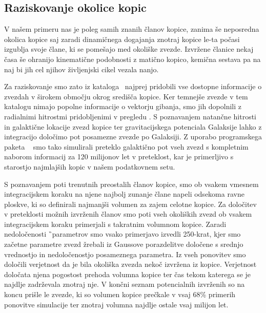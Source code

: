 \subsection{Raziskovanje okolice kopic}
V našem primeru nas je poleg samih znanih članov kopice, zanima še neposredna okolica kopice saj zaradi dinamičnega dogajanja znotraj kopice le-ta počasi izgublja svoje člane, ki se pomešajo med okoliške zvezde. Izvržene članice nekaj časa še ohranijo kinematične podobnosti z matično kopico, kemična sestava pa na naj bi jih cel njihov življenjski cikel vezala nanjo. 

Za raziskovanje smo zato iz kataloga \Gs\ najprej pridobili vse dostopne informacije o zvezdah v širokem območju okrog središča kopice. Ker temnejše zvezde v tem katalogu nimajo popolne informacije o vektorju gibanja, smo jih dopolnili z radialnimi hitrostmi pridobljenimi v pregledu \Gh. S poznavanjem natančne hitrosti in galaktične lokacije zvezd kopice ter gravitacijskega potenciala Galaksije lahko z integracijo določimo pot posamezne zvezde po Galaksiji. Z uporabo programskega paketa \GP\ \cite{2015ApJS..216...29B} smo tako simulirali preteklo galaktično pot vseh zvezd s kompletnim naborom informacij za 120 milijonov let v preteklost, kar je primerljivo s starostjo najmlajših kopic v našem podatkovnem setu.

S poznavanjem poti trenutnih preostalih članov kopice, smo ob vsakem vmesnem integracijskem koraku na njene najbolj zunanje člane napeli odsekoma ravne ploskve, ki so definirali najmanjši volumen za zajem celotne kopice. Za določitev v preteklosti možnih izvrženih članov smo poti vseh okoliških zvezd ob vsakem integracijskem koraku primerjali s takratnim volumnom kopice. Zaradi nedoločenosti \G\ parametrov smo vsako primerjavo izvedli 250-krat, kjer smo začetne parametre zvezd žrebali iz Gaussove porazdelitve določene s srednjo vrednostjo in nedoločenostjo posameznega parametra. Iz vseh ponovitev smo določili verjetnost da je bila okoliška zvezda nekoč izvržena iz kopice. Verjetnost določata njena pogostost prehoda volumna kopice ter čas tekom katerega se je najdlje zadrževala znotraj nje. V končni seznam potencialnih izvrženih so na koncu prišle le zvezde, ki so volumen kopice prečkale v vsaj $68$\% primerih ponovitve simulacije ter znotraj volumna najdlje ostale vsaj milijon let.

